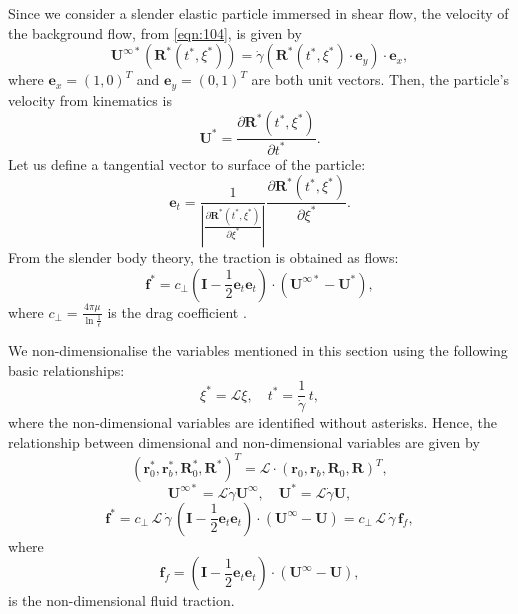 \documentclass[12pt,MSc,twoside]{muthesis_2020}
\begin{document}
Since we consider a slender elastic particle immersed in shear flow, the velocity of the background flow, from \eqref{eqn:104}, is given by
\begin{equation}
\label{eqn:21}
	\mathbf{U}^{\infty*}(\mathbf{R}^*(t^*,\xi^*))=\dot{\gamma}\left(\mathbf{R}^*(t^*,\xi^*)\cdot\mathbf{e}_y\right)\cdot\mathbf{e}_x,
\end{equation}
where $\mathbf{e}_x=(1,0)^T$ and $\mathbf{e}_y=(0,1)^T$ are both unit vectors. Then, the particle's velocity from kinematics is 
\begin{equation}
\label{eqn:22}
	\mathbf{U}^*=\frac{\partial\mathbf{R}^*(t^*,\xi^*)}{\partial t^*}.
\end{equation}
Let us define a tangential vector to surface of the particle:
\begin{equation}
\label{eqn:23}
	\mathbf{e}_t=\frac{1}{|\frac{\partial\mathbf{R}^*(t^*,\xi^*)}{\partial\xi^*}|}\frac{\partial\mathbf{R}^*(t^*,\xi^*)}{\partial\xi^*}.
\end{equation}
From the slender body theory, the traction is obtained as flows:
\begin{equation}
	\label{eqn:24}
	\mathbf{f}^*=c_\perp\left(\mathbf{I}-\frac{1}{2}\mathbf{e}_t\mathbf{e}_t\right)\cdot(\mathbf{U}^{\infty*}-\mathbf{U}^*),
\end{equation}
where $c_\perp=\frac{4\pi\mu}{\ln{\frac{1}{\epsilon}}}$ is the drag coefficient \cite{KIM199147}. 

We non-dimensionalise the variables mentioned in this section using the following basic relationships:
\begin{equation}
	\label{eqn:25}
	\xi^*=\mathcal{L}\xi, \quad t^*=\frac{1}{\dot{\gamma}}\,t,
\end{equation}
where the non-dimensional variables are identified without asterisks.
Hence, the relationship between dimensional and non-dimensional variables are given by
\begin{equation}
	\label{eqn:26}
	(\mathbf{r}_0^*, \mathbf{r}_b^*, \mathbf{R}_0^*, \mathbf{R}^*)^T=\mathcal{L}\cdot(\mathbf{r}_0, \mathbf{r}_b, \mathbf{R}_0, \mathbf{R})^T,
\end{equation}
\begin{equation}
	\label{eqn:27}
\mathbf{U}^{\infty*}=\mathcal{L}\dot{\gamma}\mathbf{U}^{\infty}, \quad \mathbf{U}^*=\mathcal{L}\dot{\gamma}\mathbf{U},
\end{equation}
\begin{equation}
	\label{eqn:28}
\mathbf{f}^*=c_\perp\,\mathcal{L}\,\dot{\gamma}\,\left(\mathbf{I}-\frac{1}{2}\mathbf{e}_t\mathbf{e}_t\right)\cdot(\mathbf{U}^{\infty}-\mathbf{U})=c_\perp\,\mathcal{L}\,\dot{\gamma}\,\mathbf{f}_{f},
\end{equation}
where 
\begin{equation}
	\label{eqn:101}
\mathbf{f}_f=\left(\mathbf{I}-\frac{1}{2}\mathbf{e}_t\mathbf{e}_t\right)\cdot(\mathbf{U}^{\infty}-\mathbf{U}),
\end{equation}
is the non-dimensional fluid traction.
\end{document}
